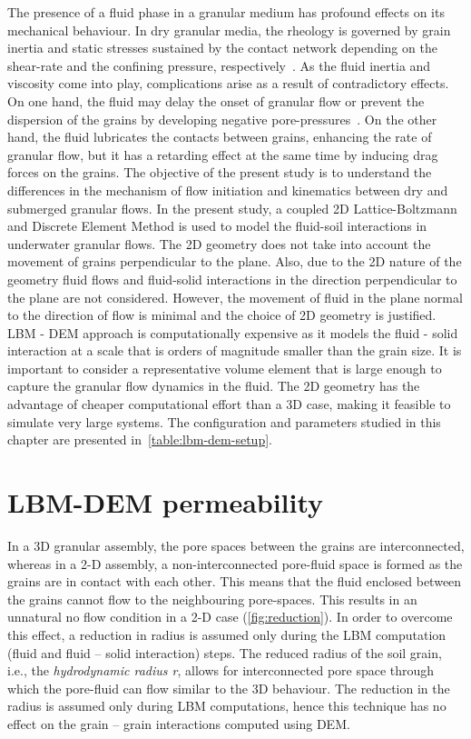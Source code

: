 The presence of a fluid phase in a granular medium has profound effects on its 
mechanical behaviour. In dry granular media, the rheology is governed by grain 
inertia and static stresses sustained by the contact network depending on the 
shear-rate and the confining pressure, respectively~\citep{Midi2004}. As the 
fluid inertia and viscosity come into play, complications arise as a result of 
contradictory effects. On one hand, the fluid may delay the onset of
granular flow or prevent the dispersion of the grains by
developing negative pore-pressures~\citep{Pailha2008,Topin2011}. On the other
hand, the fluid lubricates the contacts between grains, enhancing the rate of 
granular flow, but it has a retarding effect at the same time by 
inducing drag forces on the grains. The objective of the present study is to 
understand the differences in the mechanism of flow initiation and kinematics 
between dry and submerged granular flows. In the present study, a coupled 2D 
Lattice-Boltzmann and Discrete Element Method is used to model the fluid-soil 
interactions in  underwater granular flows. The 2D geometry does not take into 
account the movement of grains perpendicular to the plane. Also, due to the 2D 
nature of the geometry fluid flows and fluid-solid interactions in the 
direction perpendicular to the plane are not considered. However, the movement 
of fluid in the plane normal to the direction of flow is minimal and the choice 
of 2D geometry is justified. LBM - DEM approach is computationally expensive as 
it models the fluid - solid interaction at a scale that is orders of 
magnitude smaller than the grain size. It is important to consider a 
representative volume element that is large enough to capture the granular flow 
dynamics in the fluid. The 2D geometry has the advantage of 
cheaper computational effort than a 3D case, making it feasible to simulate 
very large systems. The configuration and parameters studied in this chapter 
are presented in~\cref{table:lbm-dem-setup}.



\section{LBM-DEM permeability}

In a 3D granular assembly, the pore spaces between the grains are 
interconnected, whereas in a 2-D assembly, a non-interconnected pore-fluid 
space is formed as the grains are in contact with each 
other. This means that the fluid enclosed between the grains cannot flow 
to the neighbouring pore-spaces.  This results in an unnatural no flow 
condition in a 2-D case (\cref{fig:reduction}). In order to overcome this 
effect, a reduction in radius is assumed only during the LBM computation (fluid 
and fluid – solid interaction) steps. The reduced radius of the soil grain, 
i.e., the \textit{hydrodynamic radius r}, allows for interconnected pore space 
through which the pore-fluid can flow similar to the 3D behaviour. The 
reduction in the radius is assumed only during LBM computations, hence this 
technique has no effect on the grain – grain interactions computed using DEM. 



